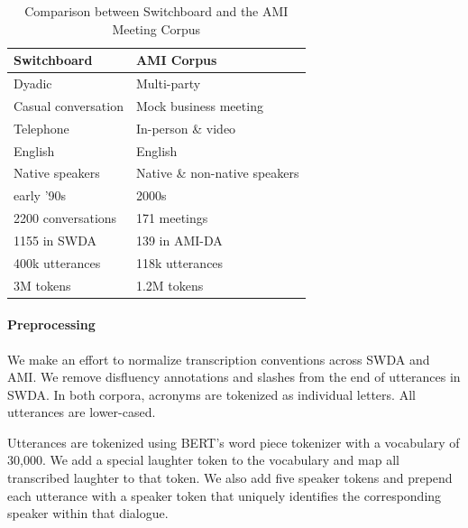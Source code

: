 \documentclass[11pt,a4paper]{article}
\begin{document}
\begin{table}[]
\centering
\begin{tabular}{@{}ll@{}}
\toprule
\textbf{Switchboard}       & \textbf{AMI Corpus}                     \\ \midrule
Dyadic                     & Multi-party                             \\
Casual conversation        & Mock business meeting                   \\
Telephone                  & In-person \& video                      \\ \midrule
English                    & English                                 \\ 
Native speakers            & Native \& non-native speakers           \\ 
early '90s                 & 2000s                                   \\ \midrule
2200 conversations         & 171 meetings                            \\
  \hspace{1em} 1155 in SWDA               & \hspace{1em} 139 in AMI-DA                           \\
400k utterances             & 118k utterances                         \\
3M tokens                  & 1.2M tokens                             \\ \bottomrule
\end{tabular}
  \caption{Comparison between Switchboard and the AMI Meeting Corpus}
  \label{table:corpora}
\end{table}

\paragraph{Preprocessing}

We make an effort to normalize transcription conventions across SWDA and AMI.
We remove disfluency annotations and slashes from the end of utterances in SWDA.
In both corpora, acronyms are tokenized as individual letters. 
All utterances are lower-cased.

Utterances are tokenized using BERT's word piece tokenizer with a vocabulary of 30,000.
We add a special laughter token to the vocabulary and map all transcribed laughter to that token.
We also add five speaker tokens and prepend each utterance with a speaker token that uniquely identifies the corresponding speaker within that dialogue.
\end{document}

